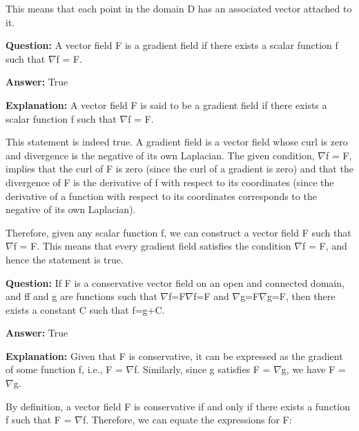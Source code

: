 \documentclass{article}
\begin{document}
This means that each point in the domain D has an associated vector attached to it.
                
                \vspace{0.5cm} 
        
            
                \textbf {Question:} A vector field F is a gradient field if there exists a scalar function f such that \ensuremath{\nabla}f = F.
                
                \textbf{Answer:} True

                \textbf{Explanation:} A vector field F is said to be a gradient field if there exists a scalar function f such that \ensuremath{\nabla}f = F.

This statement is indeed true. A gradient field is a vector field whose curl is zero and divergence is the negative of its own Laplacian. The given condition, \ensuremath{\nabla}f = F, implies that the curl of F is zero (since the curl of a gradient is zero) and that the divergence of F is the derivative of f with respect to its coordinates (since the derivative of a function with respect to its coordinates corresponds to the negative of its own Laplacian).

Therefore, given any scalar function f, we can construct a vector field F such that \ensuremath{\nabla}f = F. This means that every gradient field satisfies the condition \ensuremath{\nabla}f = F, and hence the statement is true.
                
                \vspace{0.5cm} 
        
            
                \textbf {Question:} If F is a conservative vector field on an open and connected domain, and ff and g are functions such that \ensuremath{\nabla}f=F\ensuremath{\nabla}f=F and \ensuremath{\nabla}g=F\ensuremath{\nabla}g=F, then there exists a constant C such that f=g+C.
                
                \textbf{Answer:} True

                \textbf{Explanation:} Given that F is conservative, it can be expressed as the gradient of some function f, i.e., F = \ensuremath{\nabla}f. Similarly, since g satisfies F = \ensuremath{\nabla}g, we have F = \ensuremath{\nabla}g.

By definition, a vector field F is conservative if and only if there exists a function f such that F = \ensuremath{\nabla}f. Therefore, we can equate the expressions for F:
\end{document}
